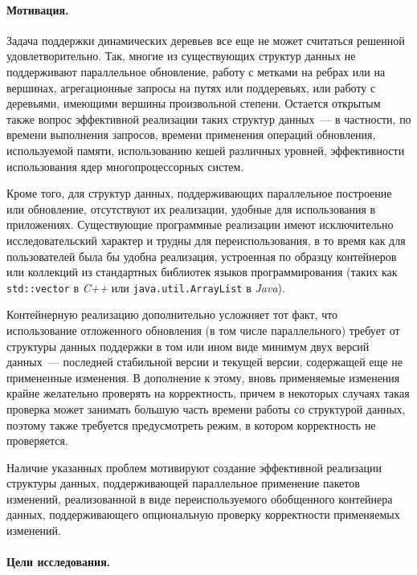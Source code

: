 \documentclass[specification,annotation,times]{itmo-student-thesis}
\begin{document}
\paragraph{Мотивация.}

Задача поддержки динамических деревьев все еще не может считаться решенной удовлетворительно. Так, многие из существующих структур данных не поддерживают параллельное
обновление, работу с метками на ребрах или на вершинах, агрегационные запросы на путях или поддеревьях, или работу с деревьями, имеющими вершины произвольной степени.
Остается открытым также вопрос эффективной реализации таких структур данных~--- в частности, по времени выполнения запросов, времени применения операций обновления,
используемой памяти, использованию кешей различных уровней, эффективности использования ядер многопроцессорных систем.

Кроме того, для структур данных, поддерживающих параллельное построение или обновление, отсутствуют их реализации, удобные для использования в приложениях.
Существующие программные реализации имеют исключительно исследовательский характер и трудны для переиспользования, в то время как для пользователей
была бы удобна реализация, устроенная по образцу контейнеров или коллекций из стандартных библиотек языков программирования (таких как
\texttt{std::vector} в \emph{C++} или \texttt{java.util.ArrayList} в \emph{Java}).

Контейнерную реализацию дополнительно усложняет тот факт, что использование отложенного обновления (в том числе параллельного) требует от структуры данных
поддержки в том или ином виде минимум двух версий данных~--- последней стабильной версии и текущей версии, содержащей еще не примененные изменения.
В дополнение к этому, вновь применяемые изменения крайне желательно проверять на корректность, причем в некоторых случаях такая проверка может занимать большую часть
времени работы со структурой данных, поэтому также требуется предусмотреть режим, в котором корректность не проверяется.

Наличие указанных проблем мотивируют создание эффективной реализации структуры данных, поддерживающей параллельное применение пакетов изменений,
реализованной в виде переиспользуемого обобщенного контейнера данных, поддерживающего опциональную проверку корректности применяемых изменений.

\paragraph{Цели исследования.}
\end{document}
